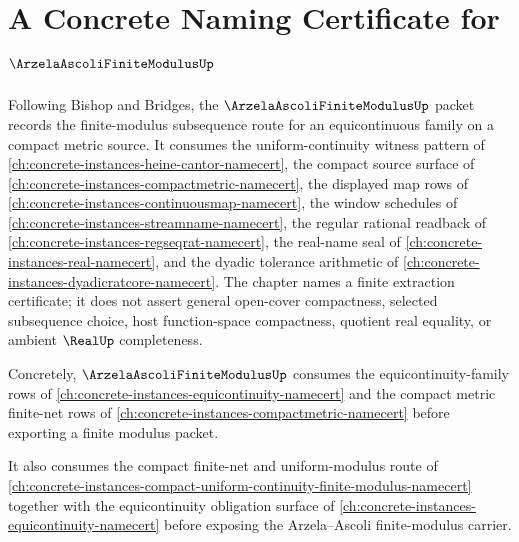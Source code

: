 \chapter{A Concrete Naming Certificate for $\ArzelaAscoliFiniteModulusUp$}
\label{ch:concrete-instances-arzela-ascoli-finite-modulus-namecert}

Following Bishop and Bridges, the $\ArzelaAscoliFiniteModulusUp$ packet records the finite-modulus subsequence route for an equicontinuous family on a compact metric source. It consumes the uniform-continuity witness pattern of \autoref{ch:concrete-instances-heine-cantor-namecert}, the compact source surface of \autoref{ch:concrete-instances-compactmetric-namecert}, the displayed map rows of \autoref{ch:concrete-instances-continuousmap-namecert}, the window schedules of \autoref{ch:concrete-instances-streamname-namecert}, the regular rational readback of \autoref{ch:concrete-instances-regseqrat-namecert}, the real-name seal of \autoref{ch:concrete-instances-real-namecert}, and the dyadic tolerance arithmetic of \autoref{ch:concrete-instances-dyadicratcore-namecert}. The chapter names a finite extraction certificate; it does not assert general open-cover compactness, selected subsequence choice, host function-space compactness, quotient real equality, or ambient $\RealUp$ completeness.

Concretely, $\ArzelaAscoliFiniteModulusUp$ consumes the equicontinuity-family rows of \autoref{ch:concrete-instances-equicontinuity-namecert} and the compact metric finite-net rows of \autoref{ch:concrete-instances-compactmetric-namecert} before exporting a finite modulus packet.

It also consumes the compact finite-net and uniform-modulus route of \autoref{ch:concrete-instances-compact-uniform-continuity-finite-modulus-namecert} together with the equicontinuity obligation surface of \autoref{ch:concrete-instances-equicontinuity-namecert} before exposing the Arzela--Ascoli finite-modulus carrier.

